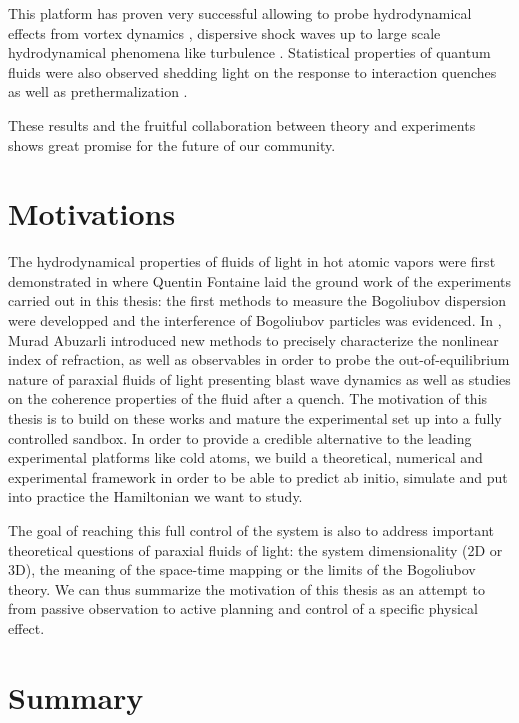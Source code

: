 This platform has proven very successful allowing to probe hydrodynamical effects from 
vortex dynamics \cite{azam_2022}, dispersive shock waves \cite{bienaime_quantitative_2021} 
up 
to large scale hydrodynamical phenomena like turbulence \cite{abobaker2022inverse}. 
Statistical properties of quantum fluids were also observed shedding light on the
response to interaction quenches \cite{steinhauer_analogue_2022} as well as prethermalization
\cite{Abuzarli_2022}.

These results and the fruitful collaboration between theory and experiments 
shows great promise for the future of our community. 

\section*{Motivations}

The hydrodynamical properties of fluids of light in hot atomic vapors were first demonstrated in \cite{fontaine_phd} 
where Quentin Fontaine laid the ground work of the experiments carried out in this thesis:
the first methods to measure the Bogoliubov dispersion were developped and the interference of Bogoliubov 
particles was evidenced.
In \cite{abuzarli_phd}, Murad Abuzarli introduced new methods to precisely characterize the nonlinear index of 
refraction, as well as observables in order to probe the out-of-equilibrium nature of paraxial fluids of light
presenting blast wave dynamics as well as studies on the coherence properties of the fluid after a quench.
The motivation of this thesis is to build on these works and mature the experimental set up into 
a fully controlled sandbox.
In order to provide a credible alternative to the leading experimental platforms like cold atoms, we
build a theoretical, numerical and experimental framework in order to be able to predict ab initio, 
simulate and put into practice the Hamiltonian we want to study.

The goal of reaching this full control of the system is also to address important theoretical questions of 
paraxial fluids of light: the system dimensionality (2D or 3D), the meaning of the space-time mapping or the limits 
of the Bogoliubov theory.
We can thus summarize the motivation of this thesis as an attempt to from passive observation to active planning 
and control of a specific physical effect.

\section*{Summary}

